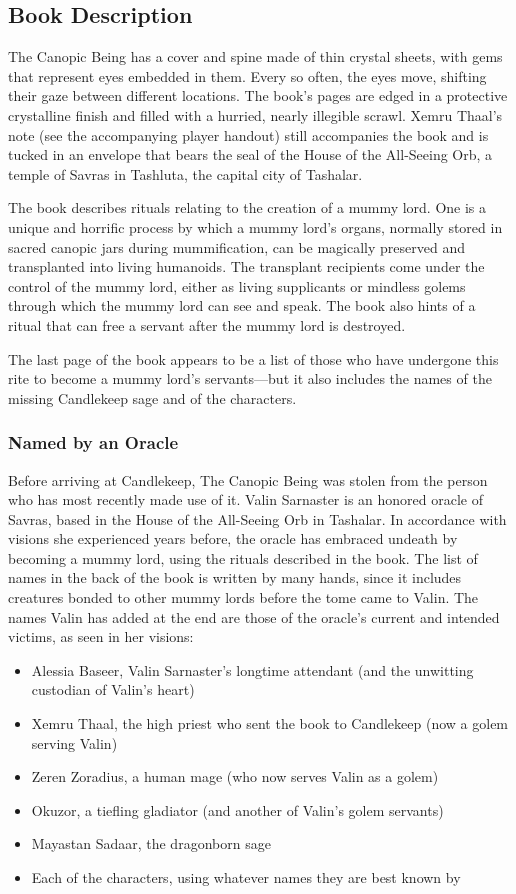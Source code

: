 \documentclass[10pt,a4paper,twoside,bg=print,twocolumn,openany,nodeprecatedcode]{dndbook}
\begin{document}
\subsection{Book Description}
The Canopic Being has a cover and spine made of thin crystal sheets, with gems that represent eyes embedded in them. Every so often, the eyes move, shifting their gaze between different locations. The book's pages are edged in a protective crystalline finish and filled with a hurried, nearly illegible scrawl. Xemru Thaal's note (see the accompanying player handout) still accompanies the book and is tucked in an envelope that bears the seal of the House of the All-Seeing Orb, a temple of Savras in Tashluta, the capital city of Tashalar.

The book describes rituals relating to the creation of a mummy lord. One is a unique and horrific process by which a mummy lord's organs, normally stored in sacred canopic jars during mummification, can be magically preserved and transplanted into living humanoids. The transplant recipients come under the control of the mummy lord, either as living supplicants or mindless golems through which the mummy lord can see and speak. The book also hints of a ritual that can free a servant after the mummy lord is destroyed.

The last page of the book appears to be a list of those who have undergone this rite to become a mummy lord's servants—but it also includes the names of the missing Candlekeep sage and of the characters.

\subsubsection{Named by an Oracle}
Before arriving at Candlekeep, The Canopic Being was stolen from the person who has most recently made use of it. Valin Sarnaster is an honored oracle of Savras, based in the House of the All-Seeing Orb in Tashalar. In accordance with visions she experienced years before, the oracle has embraced undeath by becoming a mummy lord, using the rituals described in the book. The list of names in the back of the book is written by many hands, since it includes creatures bonded to other mummy lords before the tome came to Valin. The names Valin has added at the end are those of the oracle's current and intended victims, as seen in her visions:


\begin{itemize}
\item Alessia Baseer, Valin Sarnaster's longtime attendant (and the unwitting custodian of Valin's heart)
\item Xemru Thaal, the high priest who sent the book to Candlekeep (now a golem serving Valin)
\item Zeren Zoradius, a human mage (who now serves Valin as a golem)
\item Okuzor, a tiefling gladiator (and another of Valin's golem servants)
\item Mayastan Sadaar, the dragonborn sage
\item Each of the characters, using whatever names they are best known by
\end{itemize}
\end{document}
